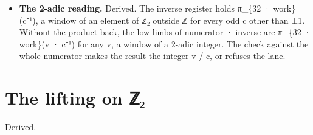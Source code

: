 \begin{itemize}
\begin{itemize}
\item It shifts the numerator and the divisor past the divisor's low zero bits.
\item It grows the odd part's inverse modulo 2\textasciicircum{}\{32 · work\} by Newton's x ← x(2 − cx) from one word, where work is the larger of the numerator's limbs and the quotient's.
\item Newton converges 2-adically. An odd c = 2m + 1 has c² = 4m(m + 1) + 1 ≡ 1 mod 8: it is its own inverse to 3 bits. If cx ≡ 1 mod 2\textasciicircum{}b, then c · x(2 − cx) = 1 − (1 − cx)² ≡ 1 mod 2\textasciicircum{}\{2b\}. In one word, four rounds give 6, 12, 24 and 48 bits, past the word's 32. The held limbs then double each round up to work.
\item The quotient is the low limbs of numerator · inverse, and the product back against the whole numerator proves it.
\end{itemize}
\item \textbf{The 2-adic reading.} Derived. The inverse register holds π\_\allowbreak{}\{32 · work\}(c⁻¹), a window of an element of ℤ₂ outside ℤ for every odd c other than ±1. Without the product back, the low limbs of numerator · inverse are π\_\allowbreak{}\{32 · work\}(v · c⁻¹) for any v, a window of a 2-adic integer. The check against the whole numerator makes the result the integer v / c, or refuses the lane.
\end{itemize}

\section{\texorpdfstring{The lifting on ℤ₂}{The lifting on ℤ₂}}

Derived.

